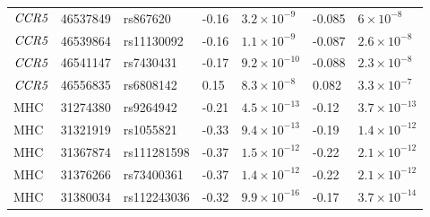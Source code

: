 \documentclass[]{article}
\begin{document}
\begin{table}[ht]
\begin{tabular}{lllP{2.2cm}P{2.2cm}P{1.6cm}P{2.2cm}}
    $\emph{CCR5}$ & 46537849 & rs867620 & -0.16 & $3.2 \times 10^{-9}$ & -0.085 & $6 \times 10^{-8}$ \\ 
    $\emph{CCR5}$ & 46539864 & rs11130092 & -0.16 & $1.1 \times 10^{-9}$ & -0.087 & $2.6 \times 10^{-8}$ \\ 
    $\emph{CCR5}$ & 46541147 & rs7430431 & -0.17 & $9.2 \times 10^{-10}$ & -0.088 & $2.3 \times 10^{-8}$ \\ 
    $\emph{CCR5}$ & 46556835 & rs6808142 & 0.15 & $8.3 \times 10^{-8}$ & 0.082 & $3.3 \times 10^{-7}$ \\ 
    MHC & 31274380 & rs9264942 & -0.21 & $4.5 \times 10^{-13}$ & -0.12 & $3.7 \times 10^{-13}$ \\ 
    MHC & 31321919 & rs1055821 & -0.33 & $9.4 \times 10^{-13}$ & -0.19 & $1.4 \times 10^{-12}$ \\ 
    MHC & 31367874 & rs111281598 & -0.37 & $1.5 \times 10^{-12}$ & -0.22 & $2.1 \times 10^{-12}$ \\ 
    MHC & 31376266 & rs73400361 & -0.37 & $1.4 \times 10^{-12}$ & -0.22 & $2.1 \times 10^{-12}$ \\ 
    MHC & 31380034 & rs112243036 & -0.32 & $9.9 \times 10^{-16}$ & -0.17 & $3.7 \times 10^{-14}$ \\ 
   \hline
\end{tabular}
\label{tab:gwas-top-associations}
\end{table}
\end{document}
